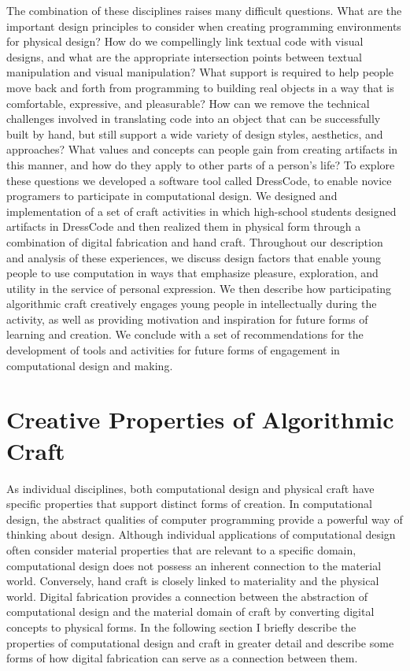 \documentclass{sigchi}
\begin{document}
The combination of these disciplines raises many difficult questions. What are the important design principles to consider when creating programming environments for physical design? How do we compellingly link textual code with visual designs, and what are the appropriate intersection points between textual manipulation and visual manipulation? What support is required to help people move back and forth from programming to building real objects in a way that is comfortable, expressive, and pleasurable? How can we remove the technical challenges involved in translating code into an object that can be successfully built by hand, but still support a wide variety of design styles, aesthetics, and approaches? What values and concepts can people gain from creating artifacts in this manner, and how do they apply to other parts of a person's life? To explore these questions we developed a software tool called DressCode, to enable novice programers to participate in computational design. We designed and implementation of a set of craft activities in which high-school students designed artifacts in DressCode and then realized them in physical form through a combination of digital fabrication and hand craft. Throughout our description and analysis of these experiences, we discuss design factors that enable young people to use computation in ways that emphasize pleasure, exploration, and utility in the service of personal expression. We then describe how participating algorithmic craft creatively engages young people in intellectually during the activity, as well as providing motivation and inspiration for future forms of learning and creation. We conclude with a set of recommendations for the development of tools and activities for future forms of engagement in computational design and making.

\section{Creative Properties of Algorithmic Craft}
As individual disciplines, both computational design and physical craft have specific properties that support distinct forms of creation. In computational design, the abstract qualities of computer programming provide a powerful way of thinking about design. Although individual applications of computational design often consider material properties that are relevant to a specific domain, computational design does not possess an inherent connection to the material world. Conversely, hand craft is closely linked to materiality and the physical world. Digital fabrication provides a connection between the abstraction of computational design and the material domain of craft by converting digital concepts to physical forms. In the following section I briefly describe the properties of computational design and craft in greater detail and describe some forms of how digital fabrication can serve as a connection between them.
\end{document}
